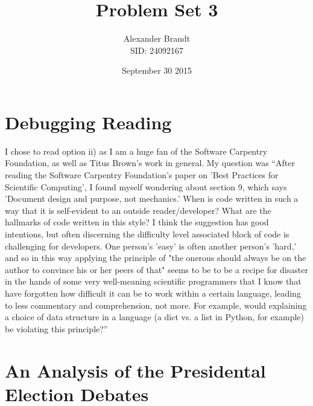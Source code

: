 \documentclass{article}\usepackage[]{graphicx}\usepackage[]{color}
\title{Problem Set 3}
\author{Alexander Brandt\\SID: 24092167}
\date{September 30 2015}
\begin{document}
\maketitle

\section{Debugging Reading}

I chose to read option ii) as I am a huge fan of the Software Carpentry Foundation, as well as Titus Brown's work in general.  My question was ``After reading the Software Carpentry Foundation's paper on 'Best Practices for Scientific Computing', I found myself wondering about section 9, which says 'Document design and purpose, not mechanics.'  When is code written in such a way that it is self-evident to an outside reader/developer?  What are the hallmarks of code written in this style?  I think the suggestion has good intentions, but often discerning the difficulty level associated block of code is challenging for developers.  One person's 'easy' is often another person's 'hard,' and so in this way applying the principle of "the onerous should always be on the author to convince his or her peers of that" seems to be to be a recipe for disaster in the hands of some very well-meaning scientific programmers that I know that have forgotten how difficult it can be to work within a certain language, leading to less commentary and comprehension, not more.  For example, would explaining a choice of data structure in a language (a dict vs. a list in Python, for example) be violating this principle?''


\section{An Analysis of the Presidental Election Debates}
\end{document}
